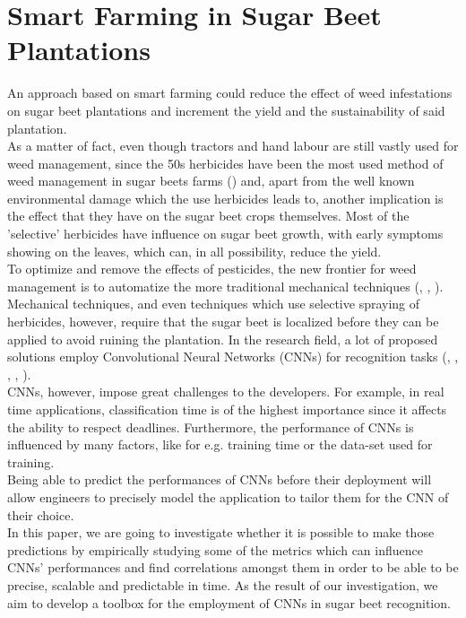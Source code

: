 \section{Smart Farming in Sugar Beet Plantations}
An approach based on smart farming could reduce the effect of weed infestations on sugar beet plantations and  increment the yield and the sustainability of said plantation.\\
As a matter of fact, even though tractors and hand labour are still vastly used for weed management, since the 50s herbicides have been the most used method of weed management in sugar beets farms (\cite{cioni_weed_2010}) and, apart from the well known environmental damage which the use herbicides leads to, another implication is the effect that they have on the sugar beet crops themselves. Most of the 'selective' herbicides have influence on sugar beet growth, with early symptoms showing on the leaves, which can, in all possibility, reduce the yield. \cite{petersen_review_2004}\\
To optimize and remove the effects of pesticides, the new frontier for weed management is to automatize the more traditional mechanical techniques (\cite{raja_real-time_2020}, \cite{frasconi_design_2014}, \cite{machleb_sensor-based_2021}).\\
Mechanical techniques, and even techniques which use selective spraying of herbicides, however, require that the sugar beet is localized before they can be applied to avoid ruining the plantation. In the research field, a lot of proposed solutions employ Convolutional Neural Networks (CNNs) for recognition tasks (\cite{gao_deep_2020}, \cite{suh_transfer_2018}, \cite{ramirez_deep_2020},  \cite{milioto2017real}, \cite{agriculture11111111}).\\
CNNs, however, impose great challenges to the developers. For example, in real time applications, classification time is of the highest importance since it affects the ability to respect deadlines. Furthermore, the performance of CNNs is influenced by many factors, like for e.g. training time or the data-set used for training.\\ %
Being able to predict the performances of CNNs before their deployment will allow engineers to precisely model the application to tailor them for the CNN of their choice. \\
In this paper, we are going to investigate whether it is possible to make those predictions by empirically studying some of the metrics which can influence CNNs' performances and find correlations amongst them in order to be able to be precise, scalable and predictable in time. As the result of our investigation, we aim to develop a toolbox for the employment of CNNs in sugar beet recognition.

